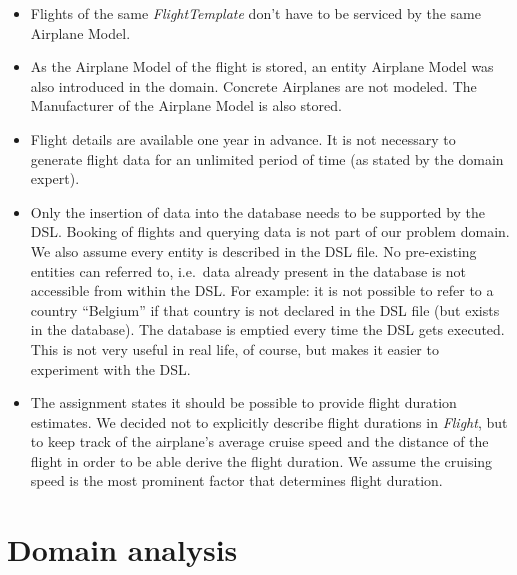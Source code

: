 \documentclass[a4paper]{article}
\newcommand{\field}[1]{\emph{#1}}
\begin{document}
\begin{itemize}
\item Flights of the same \field{FlightTemplate} don't have to be serviced by the same Airplane Model.

\item As the Airplane Model of the flight is stored, an entity Airplane Model was also introduced in the domain.
Concrete Airplanes are not modeled.
The Manufacturer of the Airplane Model is also stored.

\item Flight details are available one year in advance. It is not necessary to generate flight data for an unlimited period of time (as stated by the domain expert).

\item Only the insertion of data into the database needs to be supported by the DSL.
Booking of flights and querying data is not part of our problem domain.
We also assume every entity is described in the DSL file.
No pre-existing entities can referred to, i.e.\ data already present in the database is not accessible from within the DSL\@.
For example: it is not possible to refer to a country ``Belgium'' if that country is not declared in the DSL file (but exists in the database).
The database is emptied every time the DSL gets executed.
This is not very useful in real life, of course, but makes it easier to experiment with the DSL.

\item The assignment states it should be possible to provide flight duration estimates.
We decided not to explicitly describe flight durations in \field{Flight}, but to keep track of the airplane's average cruise speed and the distance of the flight in order to be able derive the flight duration.
We assume the cruising speed is the most prominent factor that determines flight duration.


\end{itemize}
\clearpage
\section{Domain analysis}
\label{sec:domain-analysis}
\end{document}
